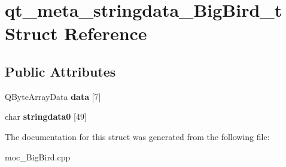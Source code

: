 \hypertarget{structqt__meta__stringdata__BigBird__t}{}\section{qt\+\_\+meta\+\_\+stringdata\+\_\+\+Big\+Bird\+\_\+t Struct Reference}
\label{structqt__meta__stringdata__BigBird__t}
\subsection*{Public Attributes}
\begin{DoxyCompactItemize}
\item 
Q\+Byte\+Array\+Data {\bfseries data} \mbox{[}7\mbox{]}\hypertarget{structqt__meta__stringdata__BigBird__t_a56b48e472c3510a7b32b2d878545ae3b}{}\label{structqt__meta__stringdata__BigBird__t_a56b48e472c3510a7b32b2d878545ae3b}

\item 
char {\bfseries stringdata0} \mbox{[}49\mbox{]}\hypertarget{structqt__meta__stringdata__BigBird__t_aa4f91a78b5eff353d11d9612c2b169cd}{}\label{structqt__meta__stringdata__BigBird__t_aa4f91a78b5eff353d11d9612c2b169cd}

\end{DoxyCompactItemize}


The documentation for this struct was generated from the following file\+:\begin{DoxyCompactItemize}
\item 
moc\+\_\+\+Big\+Bird.\+cpp\end{DoxyCompactItemize}
